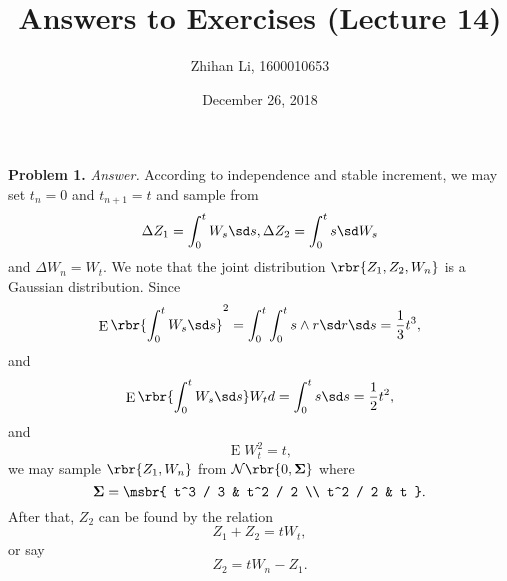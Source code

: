 \documentclass[english, nochinese]{pnote}
\title{Answers to Exercises (Lecture 14)}
\author{Zhihan Li, 1600010653}
\date{December 26, 2018}
\DeclareMathOperator\ope{\mathrm{E}}
\begin{document}
\maketitle

\textbf{Problem 1.} \textit{Answer.} According to independence and stable increment, we may set $ t_n = 0 $ and $ t_{ n + 1 } = t $ and sample from
\begin{gather}
\Delta Z_1 = \int_0^t W_s \sd s,
\Delta Z_2 = \int_0^t s \sd W_s
\end{gather}
and $ \Delta W_n = W_t $. We note that the joint distribution $ \rbr{ Z_1, Z_2, W_n } $ is a Gaussian distribution. Since
\begin{equation}
\ope \rbr{ \int_0^t W_s \sd s }^2 = \int_0^t \int_0^t s \wedge r \sd r \sd s = \frac{1}{3} t^3,
\end{equation}
and
\begin{equation}
\ope \rbr{ \int_0^t W_s \sd s } W_t d= \int_0^t s \sd s = \frac{1}{2} t^2,
\end{equation}
and
\begin{equation}
\ope W_t^2 = t,
\end{equation}
we may sample $ \rbr{ Z_1, W_n } $ from $ \mathcal{N} \rbr{ 0, \bm{\Sigma} } 
$ where
\begin{equation}
\bm{\Sigma} = \msbr{ t^3 / 3 & t^2 / 2 \\ t^2 / 2 & t }.
\end{equation}
After that, $Z_2$ can be found by the relation
\begin{equation}
Z_1 + Z_2 = t W_t,
\end{equation}
or say
\begin{equation}
Z_2 = t W_n - Z_1.
\end{equation}
\end{document}
